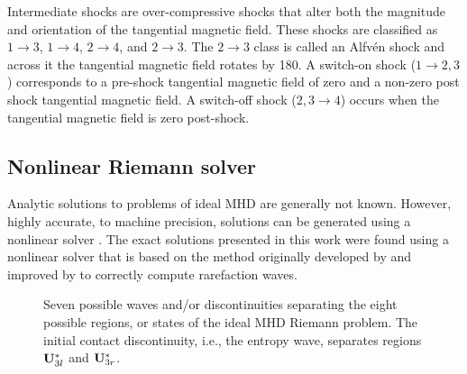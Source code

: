Intermediate shocks are over-compressive shocks that alter both the magnitude and orientation of the tangential magnetic field.  These shocks are classified as $1\rightarrow 3$, $1\rightarrow 4$, $2\rightarrow 4$, and $2\rightarrow 3$.  The $2\rightarrow 3$ class is called an Alfv{\'e}n shock and across it the tangential magnetic field rotates by 180\degree.  A switch-on shock ($1 \rightarrow 2,3$) corresponds to a pre-shock tangential magnetic field of zero and a non-zero post shock tangential magnetic field.  A switch-off shock ($2,3 \rightarrow 4$) occurs when the tangential magnetic field is zero post-shock.  

\subsection[Nonlinear Riemann solver]{Nonlinear Riemann solver}
\label{sec:mhd_exact}

Analytic solutions to problems of ideal MHD are generally not known.  However, highly accurate, to machine precision, solutions can be generated using a nonlinear solver \citep{Dai:1994a,Ryu:1995a,Torrilhon:2002}.  The exact solutions presented in this work were found using a nonlinear solver that is based on the method originally developed by \citet{Dai:1994a} and improved by \citet{Ryu:1995a} to correctly compute rarefaction waves.  

\begin{figure}[htbp]\figSpace
\begin{center}

\end{center}
\caption{Seven possible waves and/or discontinuities separating the eight possible regions, or states of the ideal MHD Riemann problem.  The initial contact discontinuity, i.e., the entropy wave, separates regions $\mathbf{U}^*_{3l}$ and $\mathbf{U}^*_{3r}$.}
\label{fig:mhd_states}
\figSpace
\end{figure}

